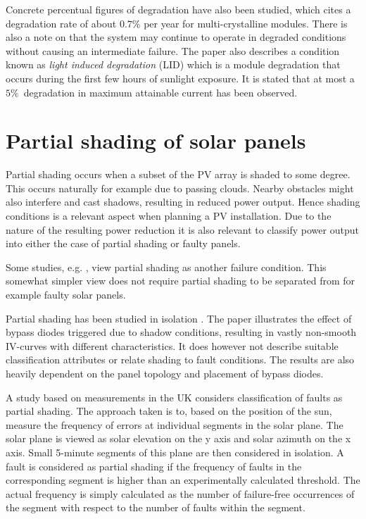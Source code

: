 Concrete percentual figures of degradation have also been studied\cite{Quintana2002}, which cites a degradation rate of about $0.7\%$ per year for multi-crystalline modules.
There is also a note on that the system may continue to operate in degraded conditions without causing an intermediate failure.
The paper also describes a condition known as \emph{light induced degradation} (LID) which is a module degradation
that occurs during the first few hours of sunlight exposure.
It is stated that at most a $5\%$ degradation in maximum attainable current has been observed.

\section{Partial shading of solar panels}
Partial shading occurs when a subset of the PV array is shaded to some degree.
This occurs naturally for example due to passing clouds.
Nearby obstacles might also interfere and cast shadows, resulting in reduced power output.
Hence shading conditions is a relevant aspect when planning a PV installation.
Due to the nature of the resulting power reduction it is also relevant to classify power output into either the case of partial shading or faulty panels.

Some studies, e.g. \cite{Stettler2005}, view partial shading as another failure condition.
This somewhat simpler view does not require partial shading to be separated from for example faulty solar panels.

Partial shading has been studied in isolation \cite{Alsayid2013}.
The paper illustrates the effect of bypass diodes triggered due to shadow conditions, resulting in vastly non-smooth IV-curves with different characteristics.
It does however not describe suitable classification attributes or relate shading to fault conditions.
The results are also heavily dependent on the panel topology and placement of bypass diodes.

A study based on measurements in the UK \cite{Firth2010} considers classification of faults as partial shading.
The approach taken is to, based on the position of the sun, measure the frequency of errors at individual segments in the solar plane.
The solar plane is viewed as solar elevation on the y axis and solar azimuth on the x axis.
Small 5-minute segments of this plane are then considered in isolation.
A fault is considered as partial shading if the frequency of faults in the corresponding segment is higher than an experimentally calculated threshold.
The actual frequency is simply calculated as the number of failure-free occurrences of the segment with respect to the number of faults within the segment.

